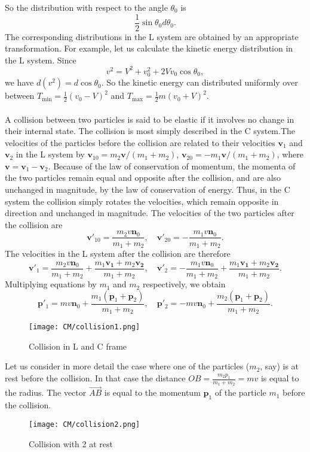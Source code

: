 So the distribution with respect to the angle $\theta_0$ is
\[\frac{1}{2}\sin\theta_0 d\theta_0.\]
The corresponding distributions in the L system are obtained by an appropriate transformation. For example, let us calculate the kinetic energy distribution in the L system.
Since
\[v^2 = V^2 + v_0^2 + 2Vv_0\cos\theta_0,\] 
we have $d(v^2) = d\cos\theta_0$. So the kinetic energy can distributed uniformly over between $T_{\mathrm{min}} = \frac{1}{2}(v_0-V)^2$ and $T_{\mathrm{max}}= \frac{1}{2}m(v_0+V)^2$.
\\ \\
A collision between two particles is said to be elastic if it involves no change in their internal state. The collision is most simply described in the C system.The velocities of the particles before the collision are related to their velocities $\bm{v}_1$ and
$\bm{v}_2$ in the L system by $\bm{v}_{10} = m_2\bm{v}/(m_1+m_2)$, $\bm{v}_{20} = -m_1\bm{v}/(m_1+m_2)$,
where $\bm{v} = \bm{v}_1-\bm{v}_2$.
Because of the law of conservation of momentum, the momenta of the two particles remain equal and opposite after the collision, and are also unchanged in magnitude, by the law of conservation of energy. 
Thus, in the C system the collision simply rotates the velocities, which remain opposite in direction and unchanged in magnitude. The velocities of the two particles after the collision are
\[\bm{v}'_{10} = \frac{m_2v\bm{n}_0}{m_1+m_2}, \quad \bm{v}'_{20} = -\frac{m_1v\bm{n}_0}{m_1+m_2}.\]
The velocities in the L system after the collision are therefore
\[\bm{v}'_{1} = \frac{m_2v\bm{n}_0}{m_1+m_2} + \frac{m_1\bm{v_1}+m_2\bm{v_2}}{m_1+m_2}, \quad \bm{v}'_{2} = -\frac{m_1v\bm{n}_0}{m_1+m_2} + \frac{m_1\bm{v_1}+m_2\bm{v_2}}{m_1+m_2}.\]
Multiplying equations by $m_1$ and $m_2$ respectively, we obtain
\[\bm{p}'_{1} = mv\bm{n}_0 + \frac{m_1(\bm{p}_1 + \bm{p}_2)}{m_1+m_2}, \quad \bm{p}'_{2} = -mv\bm{n}_0 + \frac{m_2(\bm{p}_1 + \bm{p}_2)}{m_1+m_2}.\]
\begin{figure}[!h]
	\centering
	\texttt{[image: CM/collision1.png]}
	\caption{Collision in L and C frame}
\end{figure}
\noindent
Let us consider in more detail the case where one of the particles ($m_2$, say) is at rest before the collision. In that case the distance $OB = \frac{m_2p_1}{m_1+m_2} = mv$ is equal to the radius. The vector $\vec{AB}$ is equal to the momentum $\bm{p}_1$ of the particle $m_1$ before the collision.
\begin{figure}[!h]
	\centering
	\texttt{[image: CM/collision2.png]}
	\caption{Collision with 2 at rest}
\end{figure}
